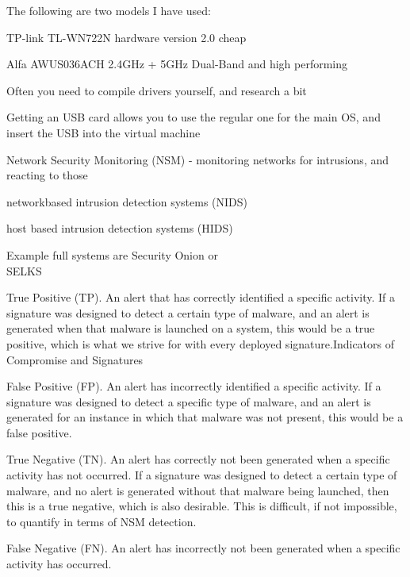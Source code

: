 \documentclass[Screen16to9,17pt]{foils}
\begin{document}
The following are two models I have used:
\begin{list2}
\item TP-link TL-WN722N hardware version 2.0 cheap
\item Alfa AWUS036ACH 2.4GHz + 5GHz Dual-Band and high performing
\item Often you need to compile drivers yourself, and research a bit
\end{list2}

Getting an USB card allows you to use the regular one for the main OS, and insert the USB into the virtual machine





\begin{list1}
\item Network Security Monitoring (NSM) - monitoring networks for intrusions, and reacting to those
\item networkbased intrusion detection systems (NIDS)
\item host based intrusion detection systems (HIDS)
\item Example full systems are Security Onion  or\\ SELKS 
\end{list1}


\begin{list2}
\item True Positive (TP). An alert that has correctly identified a specific activity. If a signature was designed to detect a certain type of malware, and an alert is generated when that malware is launched on a system, this would be a true positive, which is what we strive for with every deployed signature.Indicators of Compromise and Signatures
\item False Positive (FP). An alert has incorrectly identified a specific activity. If a signature was designed to detect a specific type of malware, and an alert is generated for an instance in which that malware was not present, this would be a false positive.
\item True Negative (TN). An alert has correctly not been generated when a specific activity has not occurred. If a signature was designed to detect a certain type of malware, and no alert is generated without that malware being launched, then this is a true negative, which is also desirable. This is difficult, if not impossible, to quantify in terms of NSM detection.
\item False Negative (FN). An alert has incorrectly not been generated when a specific activity has occurred.
\end{list2}
\end{document}
